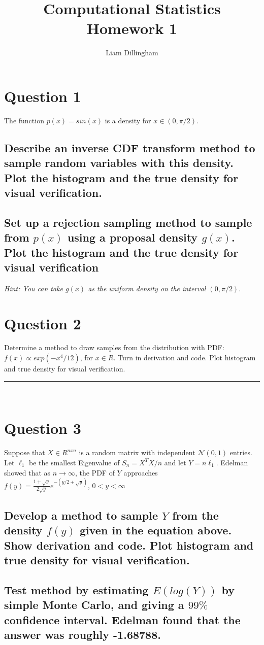 \documentclass[20pt]{article} %
\title{Computational Statistics Homework 1}
\author{Liam Dillingham}
\begin{document}
\maketitle

\section{Question 1} 
The function $p(x) = sin(x)$ is a density for $x \in (0, \pi / 2)$.
\subsection{Describe an inverse CDF transform method to sample random variables with this density.  Plot the histogram and the true density for visual verification.}

\subsection{Set up a rejection sampling method to sample from $p(x)$ using a proposal density $g(x)$. Plot the histogram and the true density for visual verification}
\textit{Hint: You can take $g(x)$ as the uniform density on the interval $(0,\pi / 2)$}. \\

\section{Question 2}
Determine a method to draw samples from the distribution with PDF: $f(x) \propto exp(-x^{4} / 12)$, for $x \in \!R$.  Turn in derivation and code. Plot histogram and true density for visual verification. \\ \noindent\rule{2cm}{0.4pt} \\


\section{Question 3}
Suppose that $X \in \!R^{nxn}$ is a random matrix with independent $\mathcal{N}(0,1)$ entries. Let $\ell_1$ be the smallest Eigenvalue of $S_n = X^{T}X/n$ and let $Y = n\ell_1$.  Edelman showed that as $n \rightarrow \infty$, the PDF of $Y$ approaches \\ 
{\Large $f(y) = \frac{1+\sqrt{y}}{2\sqrt{y}}e^{-(y/2 + \sqrt{y})}$, $0<y<\infty$ } 
\subsection{Develop a method to sample $Y$ from the density $f(y)$ given in the equation above. Show derivation and code. Plot histogram and true density for visual verification.}

\subsection{Test method by estimating $\!E(log(Y))$ by simple Monte Carlo, and giving a $99\%$ confidence interval. Edelman found that the answer was roughly -1.68788.}
\end{document}
